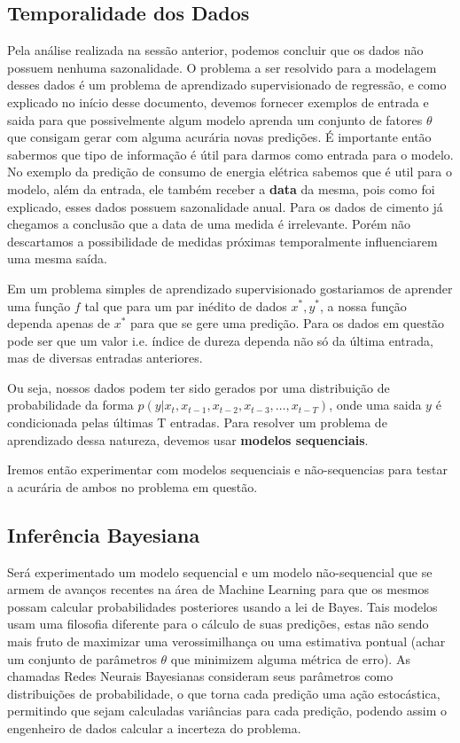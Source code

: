 \subsection{Temporalidade dos Dados}

Pela análise realizada na sessão anterior, podemos concluir que os dados não possuem nenhuma sazonalidade. O problema a ser resolvido para a modelagem desses dados é um problema de aprendizado supervisionado de regressão, e como explicado no início desse documento, devemos fornecer exemplos de entrada e saida para que possivelmente algum modelo aprenda um conjunto de fatores $\theta$ que consigam gerar com alguma acurária novas predições. É importante então sabermos que tipo de informação é útil para darmos como entrada para o modelo. No exemplo da predição de consumo de energia elétrica sabemos que é util para o modelo, além da entrada, ele também receber a \textbf{data} da mesma, pois como foi explicado, esses dados possuem sazonalidade anual. Para os dados de cimento já chegamos a conclusão que a data de uma medida é irrelevante. Porém não descartamos a possibilidade de medidas próximas temporalmente influenciarem uma mesma saída.

Em um problema simples de aprendizado supervisionado gostariamos de aprender uma função $f$ tal que para um par inédito de dados $x^*,y^*$, a nossa função dependa apenas de $x^*$ para que se gere uma predição. Para os dados em questão pode ser que um valor i.e. índice de dureza dependa não só da última entrada, mas de diversas entradas anteriores. 

Ou seja, nossos dados podem ter sido gerados por uma distribuição de probabilidade da forma $p(y | x_{t} ,x_{t -1},x_{t -2},x_{t-3} , \dots, x_{t-T})$, onde uma saida $y$ é condicionada pelas últimas T entradas. Para resolver um problema de aprendizado dessa natureza, devemos usar \textbf{modelos sequenciais}. 

Iremos então experimentar com modelos sequenciais e não-sequencias para testar a acurária de ambos no problema em questão.



\subsection{Inferência Bayesiana}

Será experimentado um modelo sequencial e um modelo não-sequencial que se armem de avanços recentes na área de Machine Learning para que os mesmos possam calcular probabilidades posteriores usando a lei de Bayes. Tais modelos usam uma filosofia diferente para o cálculo de suas predições, estas não sendo mais fruto de maximizar uma verossimilhança ou uma estimativa pontual (achar um conjunto de parâmetros $\theta$ que minimizem alguma métrica de erro). As chamadas Redes Neurais Bayesianas consideram seus parâmetros como distribuições de probabilidade, o que torna cada predição uma ação estocástica, permitindo que sejam calculadas variâncias para cada predição, podendo assim o engenheiro de dados calcular a incerteza do problema.

